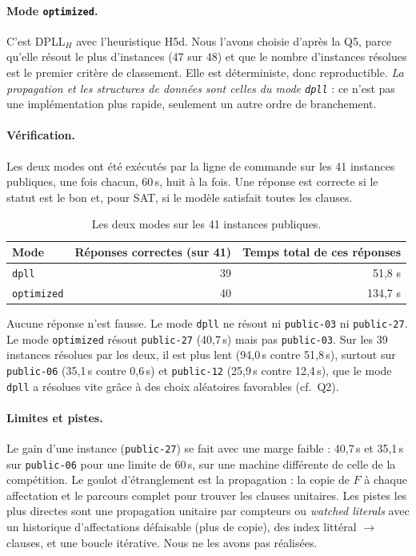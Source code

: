 \documentclass[11pt,a4paper]{article}
\begin{document}
\paragraph{Mode \texttt{optimized}.} C'est DPLL$_H$ avec l'heuristique H5d. Nous l'avons choisie d'après la Q5, parce qu'elle résout le plus d'instances (47 sur 48) et que le nombre d'instances résolues est le premier critère de classement. Elle est déterministe, donc reproductible. \emph{La propagation et les structures de données sont celles du mode \texttt{dpll}} : ce n'est pas une implémentation plus rapide, seulement un autre ordre de branchement.

\paragraph{Vérification.} Les deux modes ont été exécutés par la ligne de commande sur les 41 instances publiques, une fois chacun, 60\,s, huit à la fois. Une réponse est correcte si le statut est le bon et, pour SAT, si le modèle satisfait toutes les clauses.
\begin{table}[H]
\centering\small
\begin{tabular}{@{}lrr@{}}
\toprule
Mode & Réponses correctes (sur 41) & Temps total de ces réponses\\
\midrule
\texttt{dpll} & 39 & 51,8 s\\
\texttt{optimized} & 40 & 134,7 s\\
\bottomrule
\end{tabular}
\caption{Les deux modes sur les 41 instances publiques.}
\label{tab:q6}
\end{table}
Aucune réponse n'est fausse. Le mode \texttt{dpll} ne résout ni \texttt{public-03} ni \texttt{public-27}. Le mode \texttt{optimized} résout \texttt{public-27} (40,7\,s) mais pas \texttt{public-03}. Sur les 39 instances résolues par les deux, il est plus lent (94,0\,s contre 51,8\,s), surtout sur \texttt{public-06} (35,1\,s contre 0,6\,s) et \texttt{public-12} (25,9\,s contre 12,4\,s), que le mode \texttt{dpll} a résolues vite grâce à des choix aléatoires favorables (cf.~Q2).

\paragraph{Limites et pistes.} Le gain d'une instance (\texttt{public-27}) se fait avec une marge faible : 40,7\,s et 35,1\,s sur \texttt{public-06} pour une limite de 60\,s, sur une machine différente de celle de la compétition. Le goulot d'étranglement est la propagation : la copie de $F$ à chaque affectation et le parcours complet pour trouver les clauses unitaires. Les pistes les plus directes sont une propagation unitaire par compteurs ou \emph{watched literals} avec un historique d'affectations défaisable (plus de copie), des index littéral $\to$ clauses, et une boucle itérative. Nous ne les avons pas réalisées.
\end{document}
